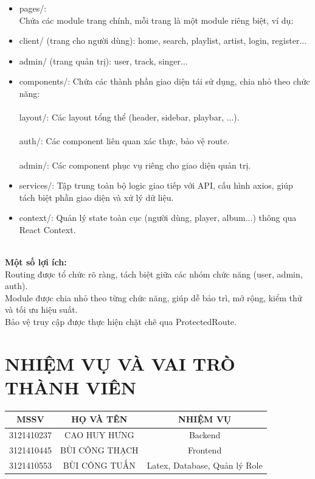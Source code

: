 \documentclass[a4paper]{article}
\begin{document}
\begin{itemize}
    \item pages/:
    \\ Chứa các module trang chính, mỗi trang là một module riêng biệt, ví dụ:
    \item client/ (trang cho người dùng): home, search, playlist, artist, login, register...
    \item admin/ (trang quản trị): user, track, singer...
    \\
    \item components/: Chứa các thành phần giao diện tái sử dụng, chia nhỏ theo chức năng:
    \\
    \\ layout/: Các layout tổng thể (header, sidebar, playbar, ...).
    \\
    \\ auth/: Các component liên quan xác thực, bảo vệ route.
    \\
    \\ admin/: Các component phục vụ riêng cho giao diện quản trị.
    \\
    \item services/:  Tập trung toàn bộ logic giao tiếp với API, cấu hình axios, giúp tách biệt phần giao diện và xử lý dữ liệu.
    \item context/:  Quản lý state toàn cục (người dùng, player, album...) thông qua React Context.
\end{itemize}
\\ \textbf{Một số lợi ích:}\\
Routing được tổ chức rõ ràng, tách biệt giữa các nhóm chức năng (user, admin, auth).
\\
Module được chia nhỏ theo từng chức năng, giúp dễ bảo trì, mở rộng, kiểm thử và tối ưu hiệu suất.
\\
Bảo vệ truy cập được thực hiện chặt chẽ qua ProtectedRoute.
\newpage
\section{NHIỆM VỤ VÀ VAI TRÒ THÀNH VIÊN}

\begin{table}[h]
    \centering
    \begin{tabular}{|c|c|c|} \hline 
         MSSV&  HỌ VÀ TÊN& NHIỆM VỤ\\ \hline 
         3121410237&  CAO HUY HƯNG& Backend\\ \hline 
         3121410445&  BÙI CÔNG THẠCH& Frontend\\ \hline
 3121410553& BÙI CÔNG TUẤN&Latex,  Database, Quản lý Role\\\hline
    \end{tabular}
    \label{tab:my_label}
\end{table}
\newpage
\end{document}
